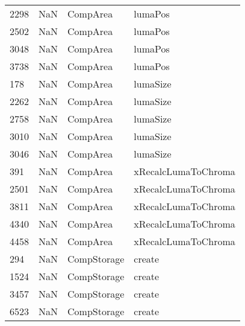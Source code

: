 \begin{tabular}{llll}
2298 &                   NaN &                   CompArea &                                   lumaPos \\
2502 &                   NaN &                   CompArea &                                   lumaPos \\
3048 &                   NaN &                   CompArea &                                   lumaPos \\
3738 &                   NaN &                   CompArea &                                   lumaPos \\
178  &                   NaN &                   CompArea &                                  lumaSize \\
2262 &                   NaN &                   CompArea &                                  lumaSize \\
2758 &                   NaN &                   CompArea &                                  lumaSize \\
3010 &                   NaN &                   CompArea &                                  lumaSize \\
3046 &                   NaN &                   CompArea &                                  lumaSize \\
391  &                   NaN &                   CompArea &                       xRecalcLumaToChroma \\
2501 &                   NaN &                   CompArea &                       xRecalcLumaToChroma \\
3811 &                   NaN &                   CompArea &                       xRecalcLumaToChroma \\
4340 &                   NaN &                   CompArea &                       xRecalcLumaToChroma \\
4458 &                   NaN &                   CompArea &                       xRecalcLumaToChroma \\
294  &                   NaN &                CompStorage &                                    create \\
1524 &                   NaN &                CompStorage &                                    create \\
3457 &                   NaN &                CompStorage &                                    create \\
6523 &                   NaN &                CompStorage &                                    create \\

\end{tabular}
